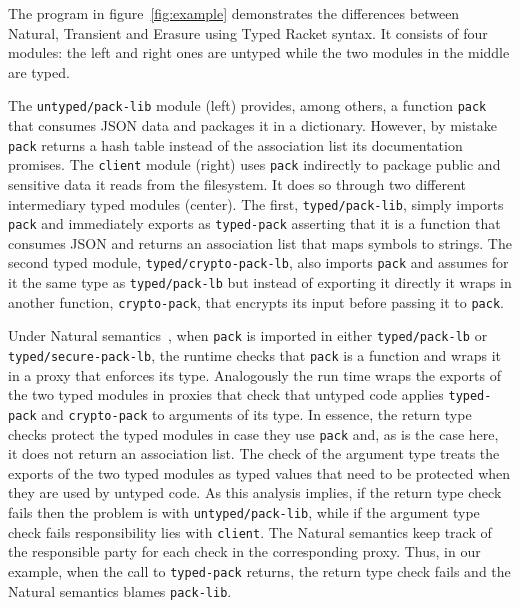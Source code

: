 
The  program in figure~\ref{fig:example} demonstrates the differences
between Natural, Transient and Erasure using Typed Racket syntax.  It
consists of four modules: the left and right ones are untyped while
the two modules in the middle are typed.

The \texttt{untyped/pack-lib} module (left) provides, among
others, a function \texttt{pack} that consumes JSON data and packages it
in a dictionary. However, by mistake \texttt{pack} returns
a hash table instead of the association list its documentation promises.
The \texttt{client} module (right) uses \texttt{pack} indirectly to
package public and sensitive data it reads from the filesystem. It does so
through two different intermediary typed modules (center). The first,
\texttt{typed/pack-lib}, simply imports \texttt{pack} and immediately
exports as \texttt{typed-pack} asserting that it is a function
that consumes JSON and returns an association list that maps symbols to
strings. The second typed module, \texttt{typed/crypto-pack-lb},
also imports \texttt{pack} and assumes for it the same type as
\texttt{typed/pack-lb} but instead of exporting it directly it wraps in
another function, \texttt{crypto-pack}, that encrypts its input before
passing it to \texttt{pack}.

Under Natural semantics~\cite{tf-popl-2008,tfffgksst-snapl-2017}, when
\texttt{pack} is imported in either \texttt{typed/pack-lb} or
\texttt{typed/secure-pack-lb}, the runtime checks that \texttt{pack} is a
function and wraps it in a proxy that enforces its  type.  Analogously
the run time wraps the exports of the two typed modules in proxies that
check that untyped code applies \texttt{typed-pack} and
\texttt{crypto-pack} to arguments of its type. In essence, the
return type checks protect  the typed modules in case they use
\texttt{pack} and, as is the case here, it does not return an association
list. The check of the argument type  treats the
exports of the two typed modules as typed values that need to be protected
when they are used by untyped code.  As this analysis implies, if the
return type check fails then the problem is with
\texttt{untyped/pack-lib}, while if the argument type check fails
responsibility lies with \texttt{client}. The Natural semantics keep track
of the responsible party for each check in the corresponding proxy. Thus,
in our example, when the call to \texttt{typed-pack} returns, the return
type check fails and the Natural semantics blames \texttt{pack-lib}.


